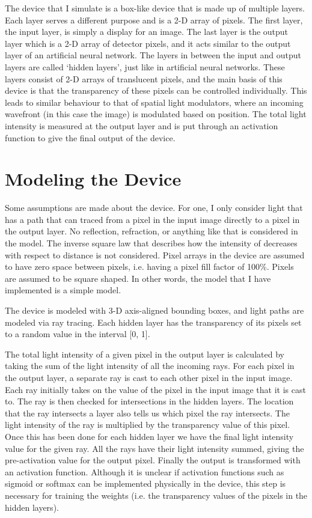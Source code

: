 \documentclass[]{article}
\begin{document}
The device that I simulate is a box-like device that is made up of multiple layers. Each layer serves a different purpose and is a 2-D array of pixels. The first layer, the input layer, is simply a display for an image. The last layer is the output layer which is a 2-D array of detector pixels, and it acts similar to the output layer of an artificial neural network. The layers in between the input and output layers are called ‘hidden layers’, just like in artificial neural networks. These layers consist of 2-D arrays of translucent pixels, and the main basis of this device is that the transparency of these pixels can be controlled individually. This leads to similar behaviour to that of spatial light modulators, where an incoming wavefront (in this case the image) is modulated based on position. The total light intensity is measured at the output layer and is put through an activation function to give the final output of the device.

\section{Modeling the Device}
Some assumptions are made about the device. For one, I only consider light that has a path that can traced from a pixel in the input image directly to a pixel in the output layer. No reflection, refraction, or anything like that is considered in the model. The inverse square law that describes how the intensity of decreases with respect to distance is not considered. Pixel arrays in the device are assumed to have zero space between pixels, i.e. having a pixel fill factor of 100\%. Pixels are assumed to be square shaped. In other words, the model that I have implemented is a simple model.

The device is modeled with 3-D axis-aligned bounding boxes, and light paths are modeled via ray tracing. Each hidden layer has the transparency of its pixels set to a random value in the interval [0, 1].

The total light intensity of a given pixel in the output layer is calculated by taking the sum of the light intensity of all the incoming rays. For each pixel in the output layer, a separate ray is cast to each other pixel in the input image. Each ray initially takes on the value of the pixel in the input image that it is cast to. The ray is then checked for intersections in the hidden layers. The location that the ray intersects a layer also tells us which pixel the ray intersects. The light intensity of the ray is multiplied by the transparency value of this pixel. Once this has been done for each hidden layer we have the final light intensity value for the given ray. All the rays have their light intensity summed, giving the pre-activation value for the output pixel. Finally the output is transformed with an activation function. Although it is unclear if activation functions such as sigmoid or softmax can be implemented physically in the device, this step is necessary for training the weights (i.e. the transparency values of the pixels in the hidden layers). 
\end{document}
